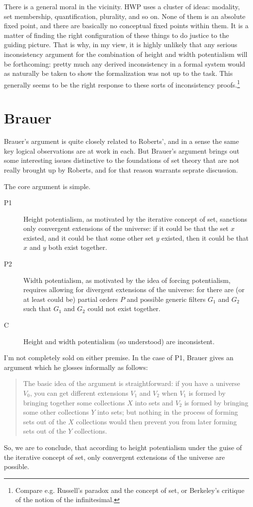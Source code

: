 \documentclass{article}
\begin{document}
There is a general moral in the vicinity.
HWP uses a cluster of ideas: modality, set membership, quantification, plurality, 
and so on. None of them is an absolute fixed point, and there are basically no 
conceptual fixed points within them. It is a matter of finding the right configuration 
of these things to do justice to the guiding picture. That is why, in my view,
it is highly unlikely that any serious inconsistency argument for the combination of
height and width potentialism will be forthcoming: 
pretty much any derived inconsistency  in a formal system would as naturally 
be taken to show 
the formalization was not up to the task. This 
generally seems to be the right response to these sorts of inconsistency proofs.\footnote{
    Compare e.g. Russell's paradox and the concept of set, or Berkeley's 
critique of the notion of the infinitesimal.}

\section{Brauer}
Brauer's argument is quite closely related to Roberts', and in a sense the 
same key logical observations are at work in each. But Brauer's argument brings 
out some interesting issues distinctive to the foundations of set theory 
that are not really brought up by Roberts, and for that reason 
warrants seprate discussion.

The core argument is simple.
\begin{description}
    \item[P1] Height potentialism, as motivated by the iterative concept of set,
    sanctions only convergent extensions of the universe: if it could be that 
    the set $x$ existed, and it could be that some other set $y$ existed, 
    then it could be that $x$ and $y$ 
    both exist together.  
    \item[P2] Width potentialism, as motivated by the idea of forcing potentialism,
    requires allowing for divergent extensions of the universe: 
    for there are (or at least could be) partial orders 
    $P$ and possible generic filters $G_1$ and $G_2$ such that $G_1$ and $G_2$ 
    could not exist together.
    \item[C] Height and width potentialism (so understood) are inconsistent.
\end{description}
I'm not completely sold on either premise. In the case of P1,
Brauer gives an argument which he glosses informally as follows:
\begin{quote}
    The basic idea of the argument is straightforward: 
    if you have a universe $V_0$, you can get different extensions 
    $V_1$ and $V_2$ when $V_1$ 
    is formed by bringing together some collections $X$ into sets and 
    $V_2$ is formed by bringing some other collections $Y$ into sets; 
    but nothing in the process of forming sets out of the 
    $X$ collections would then prevent you from 
    later forming sets out of the $Y$ collections.
\end{quote}
So, we are to conclude, that according to height potentialism under the guise of
the iterative concept of set, only convergent extensions of the universe are possible.
\end{document}
